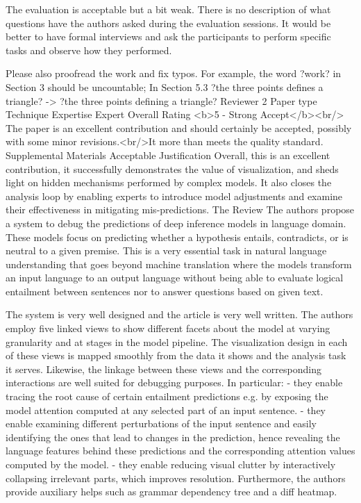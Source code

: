 The evaluation is acceptable but a bit weak. There is no description of what questions have the authors asked during the evaluation sessions. It would be better to have formal interviews and ask the participants to perform specific tasks and observe how they performed.

Please also proofread the work and fix typos. For example, the word ?work? in Section 3 should be uncountable; In Section 5.3 ?the three points defines a triangle? -> ?the three points defining a triangle?
Reviewer 2
Paper type
Technique
Expertise
Expert
Overall Rating
<b>5 - Strong Accept</b><br/> The paper is an excellent contribution and should certainly be accepted, possibly with some minor revisions.<br/>It more than meets the quality standard.
Supplemental Materials
Acceptable
Justification
Overall, this is an excellent contribution, it successfully demonstrates the value of visualization, and sheds light on hidden mechanisms performed by complex models.
It also closes the analysis loop by enabling experts to introduce model adjustments and examine their effectiveness in mitigating mis-predictions.
The Review
The authors propose a system to debug the predictions of deep inference models in language domain.
These models focus on predicting whether a hypothesis entails, contradicts, or is neutral to a given premise. 
This is a very essential task in natural language understanding that goes beyond machine translation where the models transform an input language to an output language without being able to evaluate logical entailment between sentences nor to answer questions based on given text.

The system is very well designed and the article is very well written.
The authors employ five linked views to show different facets about the model at varying granularity and at stages in the model pipeline. The visualization design in each of these views is mapped smoothly from the data it shows and the analysis task it serves.
Likewise, the linkage between these views and the corresponding interactions are well suited for debugging purposes. In particular:
- they enable tracing the root cause of certain entailment predictions e.g. by exposing the model attention computed at any selected part of an input sentence.
- they enable examining different perturbations of the input sentence and easily identifying the ones that lead to changes in the prediction, hence revealing the language features behind these predictions and the corresponding attention values computed by the model.
- they enable reducing visual clutter by interactively collapsing irrelevant parts, which improves resolution.
Furthermore, the authors provide auxiliary helps such as grammar dependency tree and a diff heatmap.

